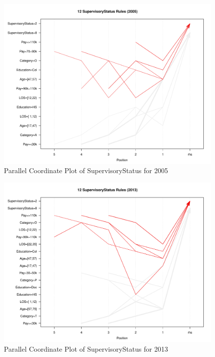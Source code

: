 \documentclass{article}
\begin{document}
    \begin{center}
        \begin{figure}
            \includegraphics[scale=0.4]{./images/supers-para-2005.pdf}
            \caption{Parallel Coordinate Plot of SupervisoryStatus for 2005}
            \label{fig:4}
        \end{figure}
    \end{center}

    \begin{center}
        \begin{figure}
            \includegraphics[scale=0.4]{./images/supers-para-2013.pdf}
            \caption{Parallel Coordinate Plot of SupervisoryStatus for 2013}
            \label{fig:5}
        \end{figure}
    \end{center}
\end{document}

